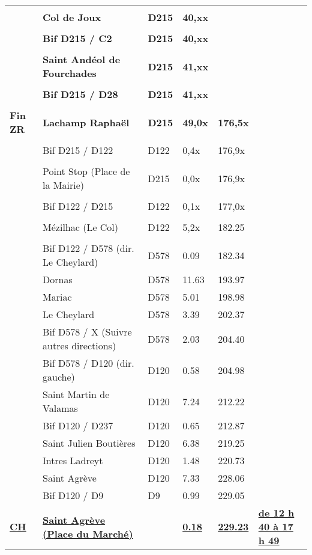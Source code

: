 \documentclass{article}%
\begin{document}
\begin{longtable}{p{2.25cm}|p{6.7cm}|p{2.0cm}|p{1.5cm}|p{1.5cm}|p{3.5cm}}
 & & & & & \\%
 &\textbf{Col de Joux }&\textbf{D215}&\textbf{40,xx}& & \\%
 & & & & & \\%
 &\textbf{Bif D215 / C2 }&\textbf{D215}&\textbf{40,xx}& & \\%
 & & & & & \\%
 &\textbf{Saint Andéol de Fourchades}&\textbf{D215}&\textbf{41,xx}& & \\%
 & & & & & \\%
 &\textbf{Bif D215 / D28}&\textbf{D215}&\textbf{41,xx}& & \\%
 & & & & & \\%
\textbf{Fin ZR}&\textbf{Lachamp Raphaël}&\textbf{D215}&\textbf{49,0x}&\textbf{176,5x}& \\%
 & & & & & \\%
 &Bif D215 / D122&D122&0,4x&176,9x& \\%
 & & & & & \\%
 &Point Stop (Place de la Mairie)&D215&0,0x&176,9x& \\%
 & & & & & \\%
 &Bif  D122 / D215&D122&0,1x&177,0x& \\%
 & & & & & \\%
 &Mézilhac (Le Col)&D122&5,2x&182.25& \\%
 & & & & & \\%
 &Bif D122 / D578 (dir. Le Cheylard)&D578&0.09&182.34& \\%
 &Dornas&D578 &11.63&193.97& \\%
 &Mariac&D578 &5.01&198.98& \\%
 &Le Cheylard&D578 &3.39&202.37& \\%
 &Bif D578 / X (Suivre autres directions)&D578 &2.03&204.40& \\%
 &Bif D578 / D120 (dir. gauche)&D120&0.58&204.98& \\%
 &Saint Martin de Valamas&D120&7.24&212.22& \\%
 &Bif D120 / D237&D120&0.65&212.87& \\%
 &Saint Julien Boutières&D120&6.38&219.25& \\%
 &Intres Ladreyt&D120&1.48&220.73& \\%
 &Saint Agrève&D120&7.33&228.06& \\%
 &Bif D120 / D9&D9&0.99&229.05& \\%
\textbf{\underline{CH}}&\textbf{\underline{Saint Agrève (Place du Marché)}}& &\textbf{\underline{0.18}}&\textbf{\underline{229.23}}&\textbf{\underline{de 12 h 40 à 17 h 49}}\\%
\hline%
\end{longtable}%
\end{document}
